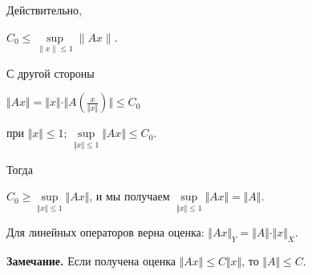 \documentclass[12pt,a4paper,titlepage,oneside]{book}
\theoremstyle{definition}
\theoremstyle{plain}
\theoremstyle{break}
\theoremstyle{remark}
\theoremstyle{remark}
\theoremstyle{remark}
\theoremstyle{remark}
\theoremstyle{plain}
\theoremstyle{plain}
\begin{document}
Действительно,
\begin{center}
$C_0 \leqslant \underset{\lVert x \rVert \leqslant  1}{\sup}\lVert Ax \rVert$.
\end{center}

С другой стороны 
\begin{center}
$\Vert Ax \Vert=
\Vert x \Vert \cdot \Vert A(\frac{x}{\Vert x \Vert}) \Vert \leqslant C_0$
\end{center} 
при $\Vert x \Vert \leqslant 1$; 
$\underset{\Vert x\Vert \leqslant 1}{\sup}\Vert Ax \Vert \leqslant C_0$.

Тогда 
\begin{center}
$ C_0 \geqslant\underset{\Vert x\Vert \leqslant 1}{\sup}\Vert Ax \Vert $, и мы получаем 
$\underset{\Vert x\Vert \leqslant 1}{\sup}\Vert Ax \Vert =\Vert A \Vert$.
\end{center}

Для линейных операторов верна оценка: $\Vert Ax \Vert _{Y} =\Vert A \Vert \cdot \Vert x \Vert_{X} $.

\textbf{Замечание.} Если получена оценка  $\Vert Ax \Vert \leqslant {C}  \Vert x \Vert$, то $\Vert A \Vert \leqslant {C} $.
\end{document}

